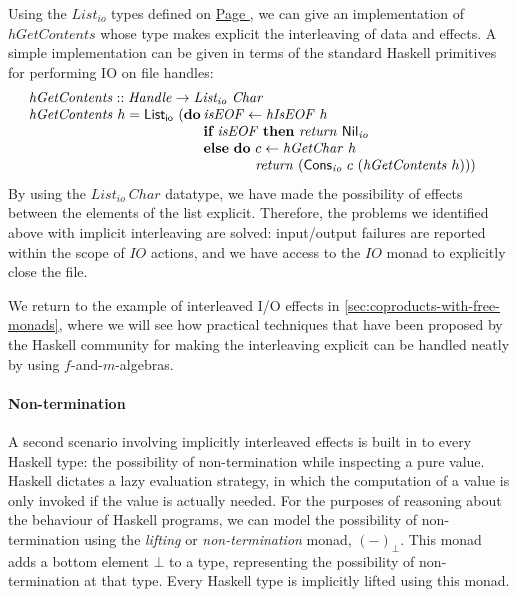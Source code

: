 \documentclass{jfp1}
\newcommand{\kw}[1]{\textbf{#1}}
\begin{document}
Using the $\mathit{List_{io}}$ types defined on
\hyperref[defn:listio]{Page \pageref*{defn:listio}}, we can give an
implementation of $\mathit{hGetContents}$ whose type makes explicit
the interleaving of data and effects. A simple implementation can be
given in terms of the standard Haskell primitives for performing IO on
file handles:
\begin{displaymath}
  \begin{array}{l}
  \mathit{hGetContents} :: \mathit{Handle} \to \mathit{List_{io}}~\mathit{Char} \\
  \begin{array}{@{}l@{\hspace{0.2em}}l}
    \mathit{hGetContents}~h = \mathsf{List_{io}}~(\kw{do} & \mathit{isEOF} \leftarrow \mathit{hIsEOF}~h \\
    & \kw{if}~\mathit{isEOF}~\kw{then}~\mathit{return}~\mathsf{Nil}_{\mathit{io}} \\
    & \kw{else}~\kw{do}~
    \begin{array}[t]{@{}l}
      c \leftarrow \mathit{hGetChar}~h \\
      \mathit{return}~(\mathsf{Cons}_{\mathit{io}}~c~(\mathit{hGetContents}~h)))
    \end{array}
  \end{array}
\end{array}
\end{displaymath}
By using the $\mathit{List_{io}}~\mathit{Char}$ datatype, we
have made the possibility of effects between the elements of the list
explicit. Therefore, the problems we identified above with implicit
interleaving are solved: input/output failures are reported within the
scope of $\mathit{IO}$ actions, and we have access to the
$\mathit{IO}$ monad to explicitly close the file.

We return to the example of interleaved I/O effects in
\autoref{sec:coproducts-with-free-monads}, where we will see how
practical techniques that have been proposed by the Haskell community
for making the interleaving explicit can be handled neatly by using
$f$-and-$m$-algebras.

\paragraph{Non-termination} A second scenario involving implicitly
interleaved effects is built in to every Haskell type: the possibility
of non-termination while inspecting a pure value. Haskell dictates a
lazy evaluation strategy, in which the computation of a value is only
invoked if the value is actually needed. For the purposes of reasoning
about the behaviour of Haskell programs, we can model the possibility
of non-termination using the \emph{lifting} or \emph{non-termination}
monad, $(-)_\bot$. This monad adds a bottom element $\bot$ to a type,
representing the possibility of non-termination at that type.  Every
Haskell type is implicitly lifted using this monad.
\end{document}
